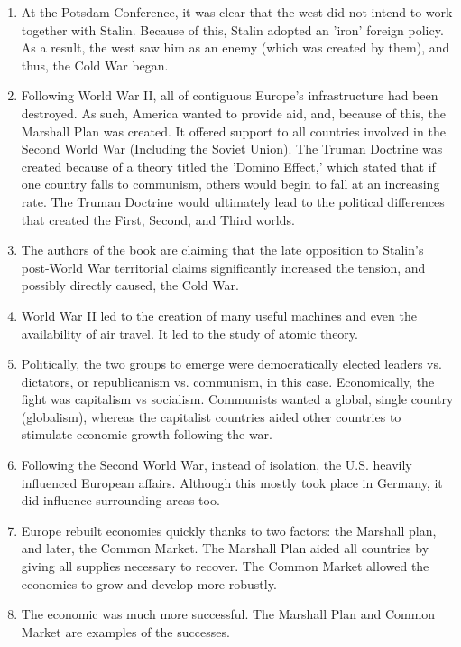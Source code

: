 \documentclass[12pt]{article}
\begin{document}
\begin{flushleft}
\begin{enumerate}
    \item At the Potsdam Conference, it was clear that the west did not intend to work together with Stalin. Because of this, Stalin adopted an 'iron' foreign policy. As a result, the west saw him as an enemy (which was created by them), and thus, the Cold War began.

    \item Following World War II, all of contiguous Europe's infrastructure had been destroyed. As such, America wanted to provide aid, and, because of this, the Marshall Plan was created. It offered support to all countries involved in the Second World War (Including the Soviet Union). The Truman Doctrine was created because of a theory titled the 'Domino Effect,' which stated that if one country falls to communism, others would begin to fall at an increasing rate. The Truman Doctrine would ultimately lead to the political differences that created the First, Second, and Third worlds.

    \item The authors of the book are claiming that the late opposition to Stalin's post-World War territorial claims significantly increased the tension, and possibly directly caused, the Cold War.

    \item World War II led to the creation of many useful machines and even the availability of air travel. It led to the study of atomic theory.

    \item Politically, the two groups to emerge were democratically elected leaders vs. dictators, or republicanism vs. communism, in this case. Economically, the fight was capitalism vs socialism. Communists wanted a global, single country (globalism), whereas the capitalist countries aided other countries to stimulate economic growth following the war.

    \item Following the Second World War, instead of isolation, the U.S. heavily influenced European affairs. Although this mostly took place in Germany, it did influence surrounding areas too.

    \item Europe rebuilt economies quickly thanks to two factors: the Marshall plan, and later, the Common Market. The Marshall Plan aided all countries by giving all supplies necessary to recover. The Common Market allowed the economies to grow and develop more robustly.

    \item The economic was much more successful. The Marshall Plan and Common Market are examples of the successes.


\end{enumerate}
\end{flushleft}
\end{document}
